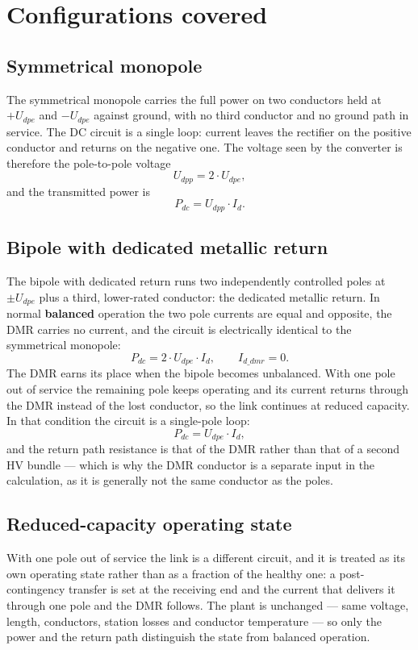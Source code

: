 \section{Configurations covered}
\label{sec:configurations}

\subsection{Symmetrical monopole}
The symmetrical monopole carries the full power on two conductors held at
$+U_{dpe}$ and $-U_{dpe}$ against ground, with no third conductor and no ground
path in service. The DC circuit is a single loop: current leaves the rectifier
on the positive conductor and returns on the negative one. The voltage seen by
the converter is therefore the pole-to-pole voltage
\[
  U_{dpp} = 2\cdot U_{dpe},
\]
and the transmitted power is
\[
  P_{dc} = U_{dpp}\cdot I_{d}.
\]

\subsection{Bipole with dedicated metallic return}
The bipole with dedicated return runs two independently controlled poles at $\pm U_{dpe}$ plus a third,
lower-rated conductor: the dedicated metallic return. In normal
\textbf{balanced} operation the two pole currents are equal and opposite, the
DMR carries no current, and the circuit is electrically identical to the
symmetrical monopole:
\[
  P_{dc} = 2\cdot U_{dpe}\cdot I_{d},
  \qquad
  I_{d\_dmr} = 0 .
\]
The DMR earns its place when the bipole becomes unbalanced. With one pole out
of service the remaining pole keeps operating and its current returns through
the DMR instead of the lost conductor, so the link continues at reduced
capacity. In that condition the circuit is a single-pole loop:
\[
  P_{dc} = U_{dpe}\cdot I_{d},
\]
and the return path resistance is that of the DMR rather than that of a second
HV bundle --- which is why the DMR conductor is a separate input in the
calculation, as it is generally not the same conductor as the poles.

\subsection{Reduced-capacity operating state}
With one pole out of service the link is a different circuit, and it is treated
as its own operating state rather than as a fraction of the healthy one: a
post-contingency transfer is set at the receiving end and the current that
delivers it through one pole and the DMR follows. The plant is unchanged ---
same voltage, length, conductors, station losses and conductor temperature ---
so only the power and the return path distinguish the state from balanced
operation.

